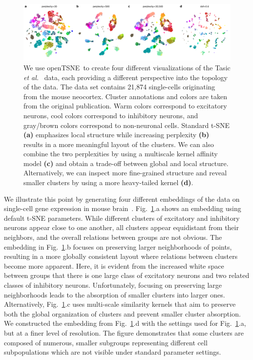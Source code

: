 \documentclass[letter]{article}
\newcommand{\opentsne}{\textsf{openTSNE}}
\begin{document}
\begin{figure}[htbp]
	\includegraphics[width=\textwidth]{tasic2018}
	\caption{\label{fig:tasic}
  We use \opentsne\ to create four different
	visualizations of the Tasic \textit{et al.}~\cite{tasic2018shared} data,
	each providing a different perspective into the topology of the data.
	The data set contains 21,874 single-cells originating from the mouse
	neocortex. Cluster annotations and colors are taken from the original
	publication. Warm colors correspond to excitatory neurons, cool colors
	correspond to inhibitory neurons, and gray/brown colors correspond to
	non-neuronal cells. Standard t-SNE \textbf{(a)} emphasizes local
	structure while increasing perplexity \textbf{(b)} results in a more
	meaningful layout of the clusters. We can also combine the two
	perplexities by using a multiscale kernel affinity model \textbf{(c)}
	and obtain a trade-off between global and local structure.
	Alternatively, we can inspect more fine-grained structure and reveal
  smaller clusters by using a more heavy-tailed kernel \textbf{(d)}.}
\end{figure}

We illustrate this point by generating four different embeddings of the data on
single-cell gene expression in mouse brain~\cite{tasic2018shared}.
Fig.~\ref{fig:tasic}.a shows an embedding using default t-SNE parameters. While
different clusters of excitatory and inhibitory neurons appear close to one
another, all clusters appear equidistant from their neighbors, and the overall
relations between groups are not obvious. The embedding in Fig.~\ref{fig:tasic}.b
focuses on preserving larger neighborhoods of points, resulting in a more
globally consistent layout where relations between clusters become more
apparent. Here, it is evident from the increased white space between groups that
there is one large class of excitatory neurons and two related classes of
inhibitory neurons. Unfortunately, focusing on preserving large neighborhoods
leads to the absorption of smaller clusters into larger ones. Alternatively,
Fig.~\ref{fig:tasic}.c uses multi-scale similarity kernels that aim to preserve
both the global organization of clusters and prevent smaller cluster absorption. We
constructed the embedding from Fig.~\ref{fig:tasic}.d with the settings used
for Fig.~\ref{fig:tasic}.a, but at a finer level of resolution.
The figure demonstrates that some clusters are composed of numerous, smaller
subgroups representing different cell subpopulations which are not visible under
standard parameter settings.
\end{document}
